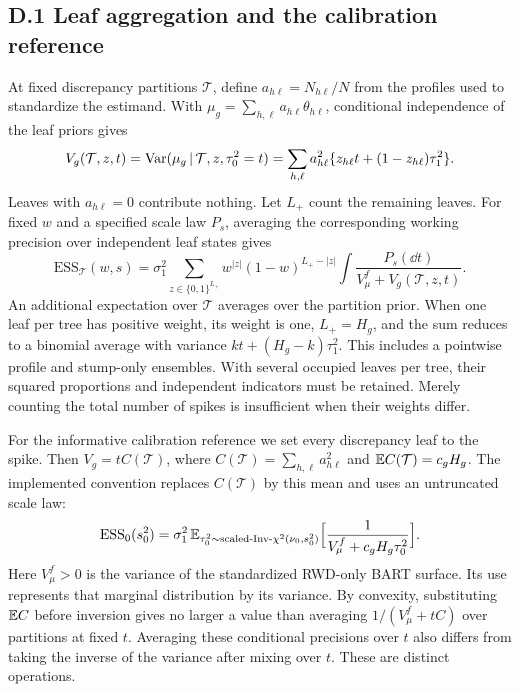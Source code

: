 \subsection*{D.1 Leaf aggregation and the calibration reference}

At fixed discrepancy partitions $\mathcal T$, define $a_{h\ell}=N_{h\ell}/N$ from the profiles used to standardize the estimand. With $\mu_g=\sum_{h,\ell}a_{h\ell}\theta_{h\ell}$, conditional independence of the leaf priors gives
\begin{equation}
V_g(\mathcal T,z,t)=\mathrm{Var}(\mu_g\,\vert\,\mathcal T,z,\tau_0^2=t)
=\sum_{h,\ell}a_{h\ell}^2\{z_{h\ell}t+(1-z_{h\ell})\tau_1^2\}.
\label{eqA:leafvariance}
\end{equation}
Leaves with $a_{h\ell}=0$ contribute nothing. Let $L_+$ count the remaining leaves. For fixed $w$ and a specified scale law $P_s$, averaging the corresponding working precision over independent leaf states gives
\[
\mathrm{ESS}_{\mathcal T}(w,s)
=\sigma_1^2\sum_{z\in\{0,1\}^{L_+}}w^{|z|}(1-w)^{L_+-|z|}
 \int\frac{P_s(\dd t)}{V_\mu^f+V_g(\mathcal T,z,t)}.
\]
An additional expectation over $\mathcal T$ averages over the partition prior. When one leaf per tree has positive weight, its weight is one, $L_+=H_g$, and the sum reduces to a binomial average with variance $kt+(H_g-k)\tau_1^2$. This includes a pointwise profile and stump-only ensembles. With several occupied leaves per tree, their squared proportions and independent indicators must be retained. Merely counting the total number of spikes is insufficient when their weights differ.

For the informative calibration reference we set every discrepancy leaf to the spike. Then $V_g=tC(\mathcal T)$, where $C(\mathcal T)=\sum_{h,\ell}a_{h\ell}^2$ and $\mathbb{E} C(\mathcal T)=c_gH_g$. The implemented convention replaces $C(\mathcal T)$ by this mean and uses an untruncated scale law:
\begin{equation}
\mathrm{ESS}_0(s_0^2)=\sigma_1^2\,\mathbb{E}_{\tau_0^2\sim\text{scaled-Inv-}\chi^2(\nu_0,s_0^2)}\Bigl[\frac1{V^f_\mu+c_gH_g\tau_0^2}\Bigr].
\label{eqA:ess0}
\end{equation}
Here $V_\mu^f>0$ is the variance of the standardized RWD-only BART surface. Its use represents that marginal distribution by its variance. By convexity, substituting $\mathbb{E} C$ before inversion gives no larger a value than averaging $1/(V_\mu^f+tC)$ over partitions at fixed $t$. Averaging these conditional precisions over $t$ also differs from taking the inverse of the variance after mixing over $t$. These are distinct operations.

